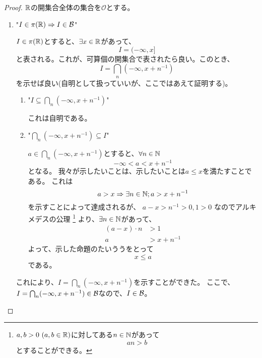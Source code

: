         \begin{proof}
            ${\mathbb{R}}$の開集合全体の集合を$\mathcal{O}$とする。
            \begin{enumerate}[font = \bfseries, label = step \arabic*.]
                \item "$I\in\pi({\mathbb{R}})\Rightarrow I\in {\mathcal{B}}$"\par
                    $I\in\pi({\mathbb{R}})$とすると、$\exists x\in{\mathbb{R}}$があって、
                    \[
                        I = (-\infty, x]
                    \]
                    と表される。これが、可算個の開集合で表されたら良い。このとき、
                    \[
                        I = \bigcap_{n} (-\infty, x + n^{-1})
                    \]
                    を示せば良い(自明として扱っていいが、ここではあえて証明する)。
                    \begin{enumerate}
                        \item "$I\subseteq \bigcap_{n} (-\infty, x + n^{-1})$"\par
                            これは自明である。
                        \item "$\bigcap_{n} (-\infty, x + n^{-1})\subseteq I$"\par
                            $a\in\bigcap_{n} (-\infty, x + n^{-1})$とすると、$\forall n\in{\mathbb{N}}$
                            \[
                                -\infty<a<x + n^{-1}
                            \]
                            となる。
                            我々が示したいことは、示したいことは$a\leq x$を満たすことである。
                            これは
                            \[
                                a > x \Rightarrow \exists n \in {\mathbb{N}}; a > x + n^{-1}
                            \]
                            を示すことによって達成されるが、
                            $a-x > n^{-1} > 0, 1 > 0$
                            なのでアルキメデスの公理
                            \footnote{
                                $a, b > 0\ (a, b\in {\mathbb{R}})$に対してある$n\in{\mathbb{N}}$があって
                                \[
                                    an > b
                                \]
                                とすることができる。
                            }
                            より、$\exists n \in {\mathbb{N}}$があって、
                            \begin{align*}
                                (a-x)\cdot n &> 1\\
                                a &> x + n^{-1}
                            \end{align*}
                            よって、示した命題のたいううをとって
                            \[
                                x \leq a
                            \]
                            である。
                    \end{enumerate}
                    これにより、$I = \bigcap_{n} (-\infty, x + n^{-1})$を示すことができた。
                    ここで、$I = \bigcap_{n} (-\infty, x + n^{-1}) \in {\mathcal{B}}$なので、$I\in{\mathcal{B}}$。
    

\end{enumerate}
\end{proof}

